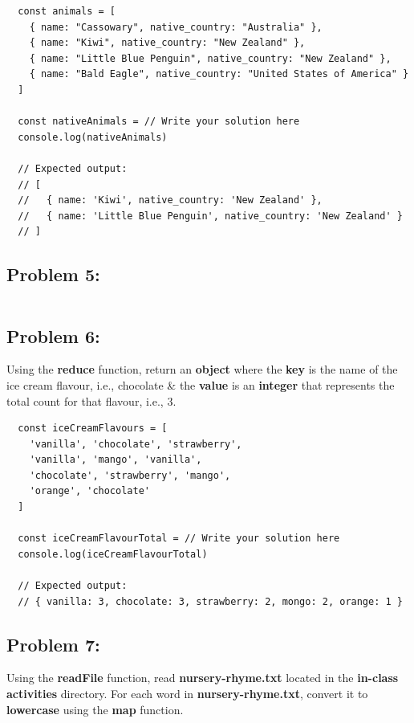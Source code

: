 \documentclass{article}
\begin{document}
\begin{verbatim}
  const animals = [
    { name: "Cassowary", native_country: "Australia" },
    { name: "Kiwi", native_country: "New Zealand" },
    { name: "Little Blue Penguin", native_country: "New Zealand" },
    { name: "Bald Eagle", native_country: "United States of America" }
  ]

  const nativeAnimals = // Write your solution here
  console.log(nativeAnimals)

  // Expected output:
  // [
  //   { name: 'Kiwi', native_country: 'New Zealand' },
  //   { name: 'Little Blue Penguin', native_country: 'New Zealand' }
  // ]
\end{verbatim} 

\subsection*{Problem 5:} 

\begin{verbatim}

\end{verbatim}

\subsection*{Problem 6:} 
Using the \textbf{reduce} function, return an \textbf{object} where the \textbf{key} is the name of the ice cream flavour, i.e., chocolate \& the \textbf{value} is an \textbf{integer} that represents the total count for that flavour, i.e., 3. 

\begin{verbatim}
  const iceCreamFlavours = [
    'vanilla', 'chocolate', 'strawberry', 
    'vanilla', 'mango', 'vanilla', 
    'chocolate', 'strawberry', 'mango', 
    'orange', 'chocolate'
  ]

  const iceCreamFlavourTotal = // Write your solution here
  console.log(iceCreamFlavourTotal)

  // Expected output:
  // { vanilla: 3, chocolate: 3, strawberry: 2, mongo: 2, orange: 1 }
\end{verbatim}

\subsection*{Problem 7:} 
Using the \textbf{readFile} function, read \textbf{nursery-rhyme.txt} located in the \textbf{in-class activities} directory. For each word in \textbf{nursery-rhyme.txt}, convert it to \textbf{lowercase} using the \textbf{map} function.  
\end{document}
